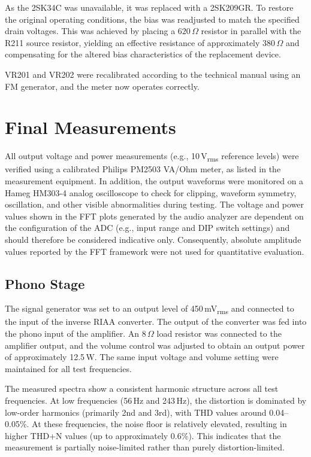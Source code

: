 \documentclass[]{article}
\begin{document}
As the 2SK34C was unavailable, it was replaced with a 2SK209GR. To restore the original operating conditions, the bias was readjusted to match the specified drain voltages. This was achieved by placing a $620\,\Omega$ resistor in parallel with the R211 source resistor, yielding an effective resistance of approximately $380\,\Omega$ and compensating for the altered bias characteristics of the replacement device.

VR201 and VR202 were recalibrated according to the technical manual using an FM generator, and the meter now operates correctly.

\section{Final Measurements}

All output voltage and power measurements (e.g., 10\,V\textsubscript{rms} reference levels) were verified using a calibrated Philips PM2503 VA/Ohm meter, as listed in the measurement equipment. In addition, the output waveforms were monitored on a Hameg HM303-4 analog oscilloscope to check for clipping, waveform symmetry, oscillation, and other visible abnormalities during testing. The voltage and power values shown in the FFT plots generated by the audio analyzer are dependent on the configuration of the ADC (e.g., input range and DIP switch settings) and should therefore be considered indicative only. Consequently, absolute amplitude values reported by the FFT framework were not used for quantitative evaluation.

\subsection{Phono Stage}

The signal generator was set to an output level of 450\,mV\textsubscript{rms} and connected to the input of the inverse RIAA converter. The output of the converter was fed into the phono input of the amplifier. An 8\,\(\Omega\) load resistor was connected to the amplifier output, and the volume control was adjusted to obtain an output power of approximately 12.5\,W. The same input voltage and volume setting were maintained for all test frequencies.

The measured spectra show a consistent harmonic structure across all test frequencies. At low frequencies (56\,Hz and 243\,Hz), the distortion is dominated by low-order harmonics (primarily 2nd and 3rd), with THD values around 0.04--0.05\%. At these frequencies, the noise floor is relatively elevated, resulting in higher THD+N values (up to approximately 0.6\%). This indicates that the measurement is partially noise-limited rather than purely distortion-limited.
\end{document}
